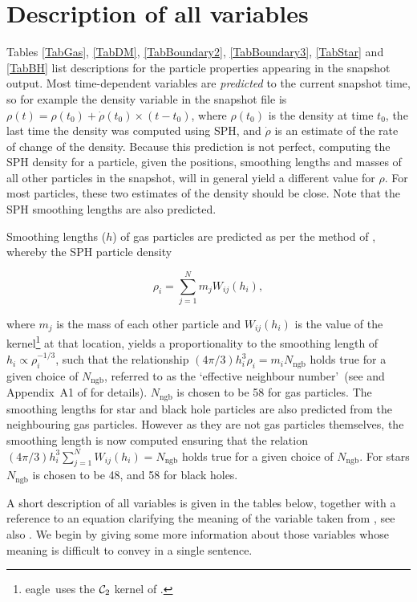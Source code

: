 \documentclass[10pt, a4paper]{article}
\newcommand{\eagle}{{\sc eagle}}
\begin{document}
\section{Description of all variables}
Tables \ref{TabGas}, \ref{TabDM}, \ref{TabBoundary2}, \ref{TabBoundary3}, \ref{TabStar} and \ref{TabBH}
list descriptions for the particle properties appearing in the snapshot output.
Most time-dependent variables are {\em predicted} to the current snapshot time,
so for example the density variable in the snapshot file is $\rho(t) =
\rho(t_0)+\dot\rho(t_0)\times (t-t_0)$, where $\rho(t_0)$ is the density at
time $t_0$, the last time the density was computed using SPH, and $\dot\rho$ is
an estimate of the rate of change of the density. Because this prediction is
not perfect, computing the SPH density for a particle, given the positions,
smoothing lengths and masses of all other particles in the snapshot, will in
general yield a different value for $\rho$. For most particles, these two
estimates of the density should be close. Note that the SPH smoothing lengths
are also predicted.

Smoothing lengths ($h$) of gas particles are predicted as per the method of
\cite{2013MNRAS.428.2840H}, whereby the SPH particle density

\begin{equation}
\label{EqRho}
\rho_i = \sum_{j=1}^N m_j W_{ij}(h_i),
\end{equation}
	
\noindent where $m_j$ is the mass of each other particle and $W_{ij}(h_i)$ is
the value of the kernel\footnote{\eagle\ uses the ${\cal C}_2$ kernel of
\cite{Wendland1995}.} at that location, yields a proportionality to the
smoothing length of $h_i \propto \rho_i^{-1/3}$, such that the relationship $(4
\pi / 3) h_i^{3} \rho_i = m_i N_{\mathrm{ngb}}$ holds true for a given choice
of $N_{\mathrm{ngb}}$, referred to as the \lq effective neighbour number\rq\
(see \cite{2013MNRAS.428.2840H} and Appendix~A1 of \cite{2015MNRAS.446..521S} for details).
$N_{\mathrm{ngb}}$ is chosen to be 58 for gas particles. The smoothing lengths
for star and black hole particles are also predicted from the neighbouring gas
particles. However as they are not gas particles themselves, the smoothing
length is now computed ensuring that the relation $(4 \pi / 3) h_i^{3}
\sum_{j=1}^N W_{ij}(h_i) = N_{\mathrm{ngb}}$ holds true for a given choice of
$N_{\mathrm{ngb}}$. For stars $N_{\mathrm{ngb}}$ is chosen to be 48, and 58 for
black holes. 

A short description of all variables is given in the tables below, together
with a reference to an equation clarifying the meaning of the variable taken
from \cite{2015MNRAS.446..521S}, see also \cite{2016A&C....15...72M}. We begin by giving some
more information about those variables whose meaning is difficult to convey in
a single sentence.
\end{document}
